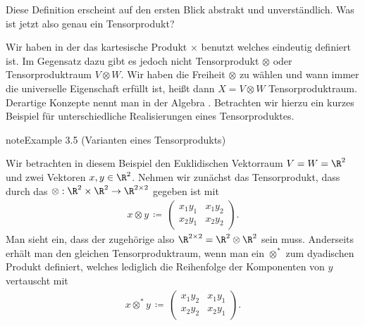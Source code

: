 \documentclass[letterpaper,10pt,german]{jupyterBook}
\begin{document}
\sphinxAtStartPar
Diese Definition erscheint auf den ersten Blick abstrakt und unverständlich.
Was ist jetzt also genau ein Tensorprodukt?

\sphinxAtStartPar
{}

\sphinxAtStartPar
Wir haben in der {\hyperref[\detokenize{vektoranalysis/tensor:def:tensor}]{}} das kartesische Produkt \(\times\) benutzt welches eindeutig definiert ist.
Im Gegensatz dazu gibt es jedoch nicht  Tensorprodukt \(\otimes\) oder  Tensorproduktraum \(V\otimes W\).
Wir haben die Freiheit \(\otimes\) zu wählen und wann immer die universelle Eigenschaft erfüllt ist, heißt dann \(X = V\otimes W\) Tensorproduktraum.
Derartige Konzepte nennt man in der Algebra .
Betrachten wir hierzu ein kurzes Beispiel für unterschiedliche Realisierungen eines Tensorproduktes.
\label{vektoranalysis/tensor:ex:tensorproduktVarianten}
\begin{sphinxadmonition}{note}{Example 3.5 (Varianten eines Tensorprodukts)}



\sphinxAtStartPar
Wir betrachten in diesem Beispiel den Euklidischen Vektorraum \(V=W=\R^2\) und zwei Vektoren \(x, y \in \R^2\).
Nehmen wir zunächst das Tensorprodukt, dass durch das  \(\otimes : \R^2 \times \R^2 \rightarrow \R^{2 \times 2}\) gegeben ist mit
\begin{equation*}
\begin{split}x \otimes y \, \coloneqq \,
\begin{pmatrix}
x_1y_1 & x_1y_2 \\
x_2y_1 & x_2y_2
\end{pmatrix}.\end{split}
\end{equation*}
\sphinxAtStartPar
Man sieht ein, dass der zugehörige  also \(\R^{2 \times 2} = \R^2 \otimes \R^2\) sein muss.
Anderseits erhält man den gleichen Tensorproduktraum, wenn man ein  \(\otimes^*\) zum dyadischen Produkt definiert, welches lediglich die Reihenfolge der Komponenten von \(y\) vertauscht mit
\begin{equation*}
\begin{split}x \otimes^* y \, \coloneqq \,
\begin{pmatrix}
x_1y_2 & x_1y_1 \\
x_2y_2 & x_2y_1
\end{pmatrix}.\end{split}
\end{equation*}\end{sphinxadmonition}
\end{document}
